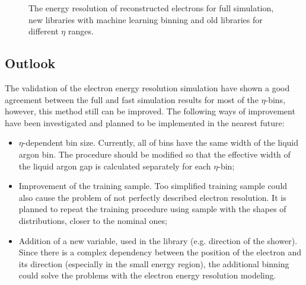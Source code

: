 \begin{figure}[!tbp]
\begin{minipage}[h]{0.45\linewidth}
\end{minipage}
\hfill
\begin{minipage}[h]{0.45\linewidth}
\end{minipage}
\vfill
\begin{minipage}[h]{0.45\linewidth}
\end{minipage}
\hfill
\begin{minipage}[h]{0.45\linewidth}
\end{minipage}
\vfill
\begin{minipage}[h]{0.45\linewidth}
\end{minipage}
\hfill
\begin{minipage}[h]{0.45\linewidth}
\end{minipage}
\caption{The energy resolution of reconstructed electrons for full simulation, new libraries with machine learning binning and old libraries for different $\eta$ ranges.}
\label{fig:Reso2}
\end{figure}

\subsection{Outlook}\label{sec:FSImpr}

The  validation of the electron energy resolution simulation have shown a good agreement between the full and fast simulation  results  for most of the $\eta$-bins, however, this method still can be improved. The following ways of improvement have been investigated and planned to be implemented in the nearest future:
\begin{itemize}
\item $\eta$-dependent bin size. Currently, all of bins have the same width of the liquid argon bin. The procedure should be modified so that the effective width of the liquid argon gap is calculated separately for each $\eta$-bin;
\item Improvement of the training sample. Too simplified training sample could also cause the problem of not perfectly described electron resolution. It is planned  to repeat the training procedure using sample  with the shapes of distributions, closer to the nominal ones;
\item  Addition of a new variable, used in the library (e.g. direction of the shower). Since there is a complex dependency between the position of the electron and its direction (especially in the small energy region), the additional binning could solve the  problems with the electron energy resolution modeling.
\end{itemize}

